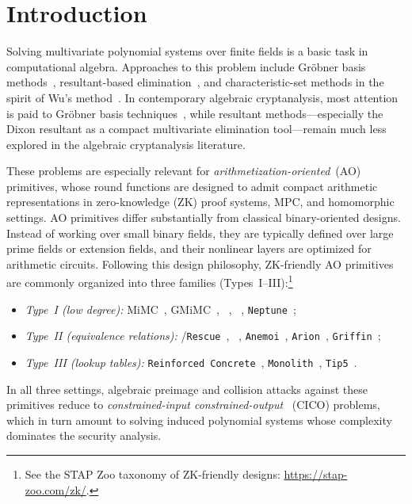 \section{Introduction}\label{Section:Introduction}

Solving multivariate polynomial systems over finite fields is a basic task in computational algebra. Approaches to this problem include Gr\"obner basis methods~\cite{sturmfels2002solving,Faugere2002,faugere1999new}, resultant-based elimination~\cite{cox2005using,macaulay1902some,DBLP:conf/issac/KapurSY94}, and characteristic-set methods in the spirit of Wu's method~\cite{Wang1996characteristic}.
In contemporary algebraic cryptanalysis, most attention is paid to Gr\"obner basis techniques~\cite{DBLP:journals/iacr/SauerS21,DBLP:journals/tosc/KoschatkoLR24}, while resultant methods---especially the Dixon resultant as a compact multivariate elimination tool---remain much less explored in the algebraic cryptanalysis literature.

These problems are especially relevant for \emph{arithmetization-oriented}~(AO) primitives, whose round functions are designed to admit compact arithmetic representations in zero-knowledge (ZK) proof systems, MPC, and homomorphic settings. AO primitives differ substantially from classical binary-oriented designs. Instead of working over small binary fields, they are typically defined over large prime fields or extension fields, and their nonlinear layers are optimized for arithmetic circuits. Following this design philosophy, ZK-friendly AO primitives are commonly organized into three families (Types~I--III):\footnote{See the STAP Zoo taxonomy of ZK-friendly designs: \url{https://stap-zoo.com/zk/}.}
\begin{itemize}[nosep]
	\item \emph{Type~I (low degree):} MiMC~\cite{DBLP:conf/asiacrypt/Albrecht0R0T16}, GMiMC~\cite{DBLP:conf/esorics/Albrecht0PRRR0S19}, \poseidon~\cite{DBLP:conf/uss/0001KR0S21}, \poseidonnew~\cite{DBLP:conf/africacrypt/GrassiKS23}, \texttt{Neptune}~\cite{DBLP:journals/tosc/GrassiOPS22};
	\item \emph{Type~II (equivalence relations):} \vision/\texttt{Rescue}~\cite{DBLP:journals/tosc/AlyABDS20}, \xhash~\cite{DBLP:journals/iacr/AshurKM23}, \texttt{Anemoi}~\cite{DBLP:conf/crypto/BouvierBCPSVW23}, \texttt{Arion}~\cite{DBLP:journals/corr/abs-2303-04639}, \texttt{Griffin}~\cite{Griffin2023};
	\item \emph{Type~III (lookup tables):} \texttt{Reinforced Concrete}~\cite{ReinforcedConcrete2022}, \texttt{Monolith}~\cite{Monolith2024}, \texttt{Tip5}~\cite{Tip5_2023}.
\end{itemize}
In all three settings, algebraic preimage and collision attacks against these primitives reduce to \emph{constrained-input constrained-output}~\cite{bertoni2007sponge} (CICO) problems, which in turn amount to solving induced polynomial systems whose complexity dominates the security analysis.

